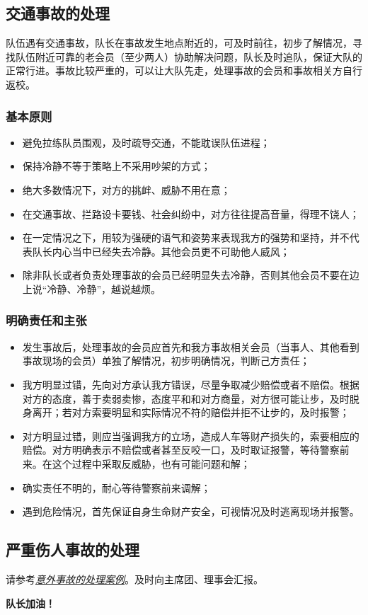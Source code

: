 \documentclass[UTF8]{ctexart}
\begin{document}
\subsection{交通事故的处理}

队伍遇有交通事故，队长在事故发生地点附近的，可及时前往，初步了解情况，寻找队伍附近可靠的老会员（至少两人）协助解决问题，队长及时追队，保证大队的正常行进。事故比较严重的，可以让大队先走，处理事故的会员和事故相关方自行返校。

\subsubsection{基本原则}
\begin{itemize}[nosep,left=2em]
    \item 避免拉练队员围观，及时疏导交通，不能耽误队伍进程；
    \item 保持冷静不等于策略上不采用吵架的方式；
    \item 绝大多数情况下，对方的挑衅、威胁不用在意；
    \item 在交通事故、拦路设卡要钱、社会纠纷中，对方往往提高音量，得理不饶人；
    \item 在一定情况之下，用较为强硬的语气和姿势来表现我方的强势和坚持，并不代表队长内心当中已经失去冷静。其他会员更不可助他人威风；
    \item 除非队长或者负责处理事故的会员已经明显失去冷静，否则其他会员不要在边上说“冷静、冷静”，越说越烦。
\end{itemize}

\subsubsection{明确责任和主张}

\begin{itemize}[nosep,left=2em]
    \item 发生事故后，处理事故的会员应首先和我方事故相关会员（当事人、其他看到事故现场的会员）单独了解情况，初步明确情况，判断己方责任；
    \item 我方明显过错，先向对方承认我方错误，尽量争取减少赔偿或者不赔偿。根据对方的态度，善于卖弱卖惨，态度平和和对方商量，对方很可能让步，及时脱身离开；若对方索要明显和实际情况不符的赔偿并拒不让步的，及时报警；
    \item 对方明显过错，则应当强调我方的立场，造成人车等财产损失的，索要相应的赔偿。对方明确表示不赔偿或者甚至反咬一口，及时取证报警，等待警察前来。在这个过程中采取反威胁，也有可能问题和解；
    \item 确实责任不明的，耐心等待警察前来调解；
    \item 遇到危险情况，首先保证自身生命财产安全，可视情况及时逃离现场并报警。
\end{itemize}

\subsection{严重伤人事故的处理}

请参考\href{https://www.chexie.net/bbs/content/?bid=7&tid=839#5}{\textit{意外事故的处理案例}}。及时向主席团、理事会汇报。


\center\Large{\color{red}\textbf{队长加油！}}
\end{document}
